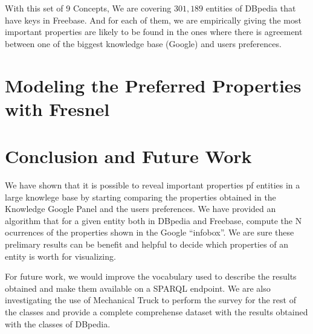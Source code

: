 \documentclass[runningheads,a4paper]{llncs}
\begin{document}
 \begin{table}[!htp]
\end{table}
With this set of 9 Concepts, We are covering $301,189$ entities of DBpedia that have keys in Freebase. And for each of them, we are empirically giving the most important properties are likely to be found in the ones where there is agreement between one of the biggest knowledge base (Google) and users preferences.


\section{Modeling the Preferred Properties with Fresnel}
\label{sec:fresnel}



\section{Conclusion and Future Work}
\label{sec:conclusion}
We have shown that it is possible to reveal important properties pf entities in a large knowlege base by starting comparing the properties obtained in the Knowledge Google Panel and the users preferences. We have provided an algorithm that for a given entity both in DBpedia and Freebase, compute the N ocurrences of the properties shown in the Google ``infobox''. We are sure these prelimary results can be benefit and helpful to decide which properties of an entity is worth for visualizing.  

For future work, we would improve the vocabulary used to describe the results obtained and make them available on a SPARQL endpoint. We are also investigating the use of Mechanical Truck to perform the survey for the rest of the classes and provide a complete comprehense dataset with the results obtained with the classes of DBpedia. 
\end{document}
